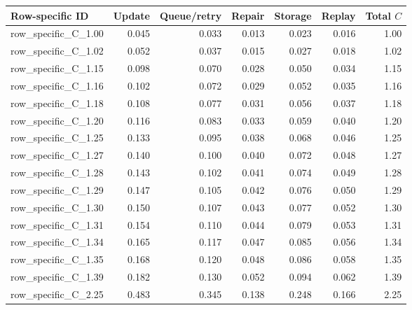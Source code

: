 \documentclass[10pt,a4paper,landscape]{article}
\begin{document}
\begin{center}\scriptsize\begin{tabular}{lrrrrrr}\toprule Row-specific ID & Update & Queue/retry & Repair & Storage & Replay & Total $C$ \\\midrule
row\_specific\_C\_1.00 & 0.045 & 0.033 & 0.013 & 0.023 & 0.016 & 1.00 \\

row\_specific\_C\_1.02 & 0.052 & 0.037 & 0.015 & 0.027 & 0.018 & 1.02 \\

row\_specific\_C\_1.15 & 0.098 & 0.070 & 0.028 & 0.050 & 0.034 & 1.15 \\

row\_specific\_C\_1.16 & 0.102 & 0.072 & 0.029 & 0.052 & 0.035 & 1.16 \\

row\_specific\_C\_1.18 & 0.108 & 0.077 & 0.031 & 0.056 & 0.037 & 1.18 \\

row\_specific\_C\_1.20 & 0.116 & 0.083 & 0.033 & 0.059 & 0.040 & 1.20 \\

row\_specific\_C\_1.25 & 0.133 & 0.095 & 0.038 & 0.068 & 0.046 & 1.25 \\

row\_specific\_C\_1.27 & 0.140 & 0.100 & 0.040 & 0.072 & 0.048 & 1.27 \\

row\_specific\_C\_1.28 & 0.143 & 0.102 & 0.041 & 0.074 & 0.049 & 1.28 \\

row\_specific\_C\_1.29 & 0.147 & 0.105 & 0.042 & 0.076 & 0.050 & 1.29 \\

row\_specific\_C\_1.30 & 0.150 & 0.107 & 0.043 & 0.077 & 0.052 & 1.30 \\

row\_specific\_C\_1.31 & 0.154 & 0.110 & 0.044 & 0.079 & 0.053 & 1.31 \\

row\_specific\_C\_1.34 & 0.165 & 0.117 & 0.047 & 0.085 & 0.056 & 1.34 \\

row\_specific\_C\_1.35 & 0.168 & 0.120 & 0.048 & 0.086 & 0.058 & 1.35 \\

row\_specific\_C\_1.39 & 0.182 & 0.130 & 0.052 & 0.094 & 0.062 & 1.39 \\

row\_specific\_C\_2.25 & 0.483 & 0.345 & 0.138 & 0.248 & 0.166 & 2.25 \\

\bottomrule\end{tabular}\end{center}
\end{document}
